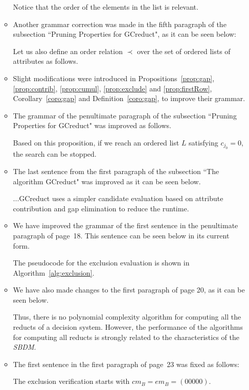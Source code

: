 \documentclass{letter}
\begin{document}
\begin{letter}{}
\begin{enumerate}
\begin{itemize}
		Notice that the order of the elements in the list is relevant.
		 
		\item Another grammar correction was made in the fifth paragraph of the subsection ``Pruning Properties for GCreduct", as it can be seen below:
		
		Let us also define an order relation $\prec$ over the set of ordered lists of attributes as follows.
		
		\item Slight modifications were introduced in Propositions~\ref{prop:gap}, \ref{prop:contrib}, \ref{prop:cumul}, \ref{prop:exclude} and \ref{prop:firstRow}, Corollary~\ref{coro:gap} and Definition~\ref{coro:gap}, to improve their grammar.  
		
		\item The grammar of the penultimate paragraph of the subsection ``Pruning Properties for GCreduct" was improved as follows.
		
		Based on this proposition, if we reach an ordered list $L$ satisfying $c_{j_0}=0$, the search can be stopped.
		
		\item The last sentence from the first paragraph of the subsection ``The algorithm GCreduct" was improved as it can be seen below.
		
		...GCreduct uses a simpler candidate evaluation based on attribute contribution and gap elimination to reduce the runtime. 
		
		\item We have improved the grammar of the first sentence in the penultimate paragraph of page~18. This sentence can be seen below in its current form.
		
		The pseudocode for the exclusion evaluation is shown in Algorithm~\ref{alg:exclusion}.
		
		\item We have also made changes to the first paragraph of page 20, as it can be seen below.
		
		Thus, there is no  polynomial complexity algorithm for computing all the reducts of a decision system. However, the performance of the algorithms for computing all reducts is strongly related to the characteristics of the \textit{SBDM}. 
		
		\item The first sentence in the first paragraph of page~23 was fixed as follows:
		
		The exclusion verification starts with $cm_B = em_B = (00000)$.
		

\end{itemize}
\end{enumerate}
\end{letter}
\end{document}
